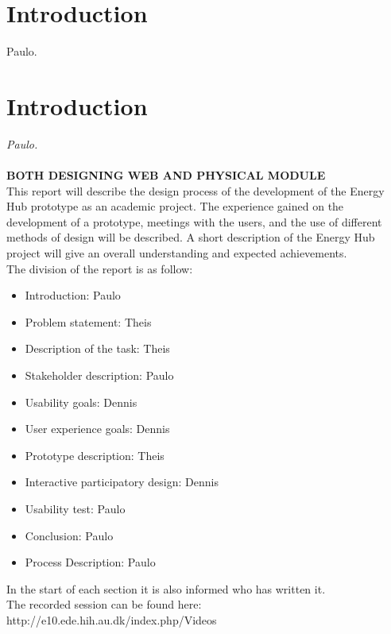 \section{Introduction}Paulo.\\

\section{Introduction}\textit{Paulo.}\\
\\ \textbf{BOTH DESIGNING WEB AND PHYSICAL MODULE}
\\This report will describe the design process of the development of the Energy Hub prototype as an academic project. The experience gained on the development of a prototype, meetings with the users, and the use of different methods of design will be described. A short description of the Energy Hub project will give an overall understanding and expected achievements.
\\ The division of the report is as follow: 
\begin{itemize}
	\item Introduction: Paulo
	\item Problem statement: Theis
	\item Description of the task: Theis
	\item Stakeholder description: Paulo
	\item Usability goals: Dennis
	\item User experience goals: Dennis
	\item Prototype description: Theis
	\item Interactive participatory design: Dennis
	\item Usability test: Paulo
	\item Conclusion: Paulo
	\item Process Description: Paulo
\end{itemize}
In the start of each section it is also informed who has written it.
\\
The recorded session can be found here: http://e10.ede.hih.au.dk/index.php/Videos
